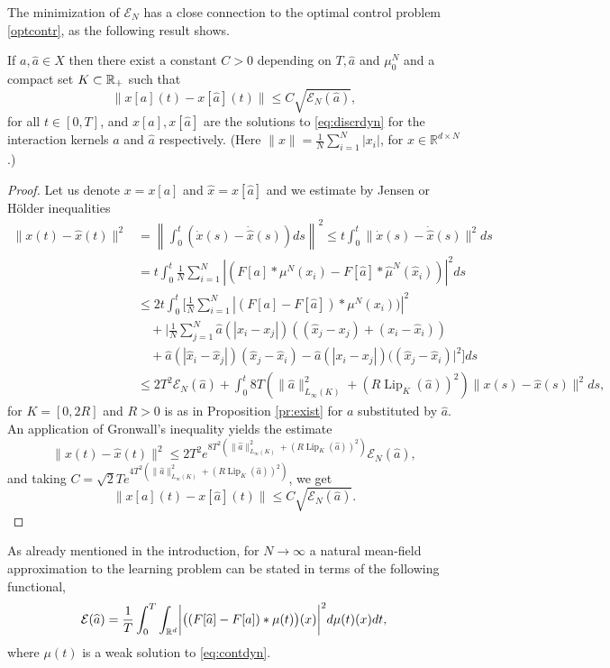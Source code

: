 The minimization of $\mathcal E_N$ has a close connection to the optimal control problem \eqref{optcontr}, as the following result shows.
\begin{proposition}\label{trajapprox}
If $a,\widehat a \in X$ then there exist a constant $C>0$ depending on $T,\widehat a$ and $\mu_0^N$ and a compact set $K \subset \mathbb{R}_+$ such that
\begin{equation}\label{eq:trajapprox}
\| x[a](t) -x[\widehat a](t) \| \leq C \sqrt{\mathcal E_N(\widehat a)}, 
\end{equation}
for all $t \in [0,T]$, and $x[a], x[\widehat a]$ are the solutions to \eqref{eq:discrdyn} for the interaction kernels $a$ and $\widehat a$ respectively. (Here $\| x \| = \frac{1}{N} \sum_{i=1}^N |x_i|$, for $x \in \mathbb R^{d \times N}$.)
\end{proposition}
\begin{proof}
Let us denote $x=x[a]$ and $\widehat x =x[\widehat a]$ and we estimate by Jensen or H\"older inequalities
\begin{align*}
\|x(t) - \widehat x(t) \|^2 & = \left \| \int_0^t ( \dot x(s) - \dot{\widehat x}(s)) ds \right \|^2 \leq  t \int_0^t \| \dot x(s) - \dot{\widehat x}(s) \|^2 ds \\
&=  t \int_0^t \frac{1}{N} \sum_{i=1}^N \left | (F[a] * \mu^N(x_i)- F[\widehat a] * \widehat \mu^N(\widehat x_i)) \right |^2 ds\\
&\leq 2 t \int_0^t \Bigg[  \frac{1}{N} \sum_{i=1}^N \left| (F[a] - F[\widehat a]) *  \mu^N( x_i)) \right |^2 \\
&\quad +\Bigg| \frac{1}{N} \sum_{j=1}^N \widehat a(|x_i-x_j|)( (\widehat x_j - x_j) + (x_i-\widehat x_i))  \\
&\quad+ \widehat a(| \widehat x_i-\widehat x_j|)( \widehat x_j - \widehat x_i) -  \widehat a(| x_i- x_j |)( (\widehat x_j - \widehat x_i) \Bigg|^2  \Bigg ] ds \\
&\leq 2 T^2 \mathcal E_N(\widehat a) +  \int_0^t 8 T( \|\widehat a\|_{L_\infty(K)}^2 + (R \operatorname{Lip}_K(\widehat a) ) ^2 )\|x(s) - \widehat x(s) \|^2  ds,
\end{align*}
for $K=[0,2 R]$ and $R>0$ is as in Proposition \ref{pr:exist} for $a$ substituted by $\widehat a$.
An application of Gronwall's inequality yields the estimate
$$
\|x(t) - \widehat x(t) \|^2 \leq 2 T^2   e^{8 T^2( \|\widehat a\|_{L_\infty(K)}^2 + (R \operatorname{Lip}_K(\widehat a) ) ^2)} \mathcal E_N(\widehat a),
$$
and taking $C = \sqrt{2} T e^{4 T^2( \|\widehat a\|_{L_\infty(K)}^2 + (R \operatorname{Lip}_K(\widehat a) ) ^2)}$, we get
$$
\| x[a](t) -x[\widehat a](t) \| \leq C \sqrt{\mathcal E_N(\widehat a)}.
$$
\end{proof}
As already mentioned in the introduction, for $N \to \infty$ a natural mean-field approximation to the learning problem can be stated in terms of the following functional,
\begin{align*}
	\mathcal E(\widehat a)=\frac{1}{T}\int_0^T \int_{\mathbb{R}^d} \biggl|\bigl((F[\widehat a]-F[a])\ast\mu(t)\bigr)(x)\biggr|^2d\mu(t)(x)dt,
\end{align*}
where $\mu(t)$ is a weak solution to \eqref{eq:contdyn}. 

